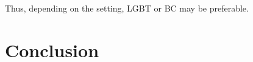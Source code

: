 \documentclass{article}
\begin{document}
Thus, depending on the setting, LGBT or BC may be preferable.






\section{Conclusion}%
\end{document}
